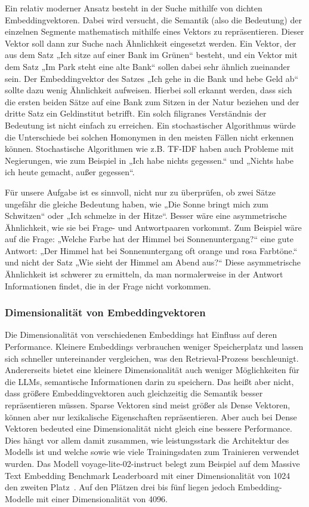 Ein relativ moderner Ansatz besteht in der Suche mithilfe von dichten Embeddingvektoren.
Dabei wird versucht, die Semantik (also die Bedeutung) der einzelnen Segmente mathematisch mithilfe eines Vektors zu repräsentieren.
Dieser Vektor soll dann zur Suche nach Ähnlichkeit eingesetzt werden.
Ein Vektor, der aus dem Satz „Ich sitze auf einer Bank im Grünen“ besteht, und ein Vektor mit dem Satz „Im Park steht eine alte Bank“ sollen dabei sehr ähnlich zueinander sein.
Der Embeddingvektor des Satzes „Ich gehe in die Bank und hebe Geld ab“ sollte dazu wenig Ähnlichkeit aufweisen.
Hierbei soll erkannt werden, dass sich die ersten beiden Sätze auf eine Bank zum Sitzen in der Natur beziehen und der dritte Satz ein Geldinstitut betrifft.
Ein solch filigranes Verständnis der Bedeutung ist nicht einfach zu erreichen.
Ein stochastischer Algorithmus würde die Unterschiede bei solchen Homonymen in den meisten Fällen nicht erkennen können. 
Stochastische Algorithmen wie z.B. TF-IDF haben auch Probleme mit Negierungen, wie zum Beispiel in „Ich habe nichts gegessen.“ und „Nichts habe ich heute gemacht, außer gegessen“.

Für unsere Aufgabe ist es sinnvoll, nicht nur zu überprüfen, ob zwei Sätze ungefähr die gleiche Bedeutung haben, wie „Die Sonne bringt mich zum Schwitzen“ oder „Ich schmelze in der Hitze“.
Besser wäre eine asymmetrische Ähnlichkeit, wie sie bei Frage- und Antwortpaaren vorkommt.
Zum Beispiel wäre auf die Frage: „Welche Farbe hat der Himmel bei Sonnenuntergang?“ eine gute Antwort: „Der Himmel hat bei Sonnenuntergang oft orange und rosa Farbtöne.“ und nicht der Satz „Wie sieht der Himmel am Abend aus?“
Diese asymmetrische Ähnlichkeit ist schwerer zu ermitteln, da man normalerweise in der Antwort Informationen findet, die in der Frage nicht vorkommen.

\subsubsection{Dimensionalität von Embeddingvektoren}

Die Dimensionalität von verschiedenen Embeddings hat Einfluss auf deren Performance.
Kleinere Embeddings verbrauchen weniger Speicherplatz und lassen sich schneller untereinander vergleichen, was den Retrieval-Prozess beschleunigt.
Andererseits bietet eine kleinere Dimensionalität auch weniger Möglichkeiten für die LLMs, semantische Informationen darin zu speichern.
Das heißt aber nicht, dass größere Embeddingvektoren auch gleichzeitig die Semantik besser repräsentieren müssen.
Sparse Vektoren sind meist größer als Dense Vektoren, können aber nur lexikalische Eigenschaften repräsentieren.
Aber auch bei Dense Vektoren bedeuted eine Dimensionalität nicht gleich eine bessere Performance.
Dies hängt vor allem damit zusammen, wie leistungsstark die Architektur des Modells ist und welche sowie wie viele Trainingsdaten zum Trainieren verwendet wurden.
Das Modell voyage-lite-02-instruct belegt zum Beispiel auf dem Massive Text Embedding Benchmark Leaderboard mit einer Dimensionalität von 1024 den zweiten Platz~\cite{mteb}.
Auf den Plätzen drei bis fünf liegen jedoch Embedding-Modelle mit einer Dimensionalität von 4096.

